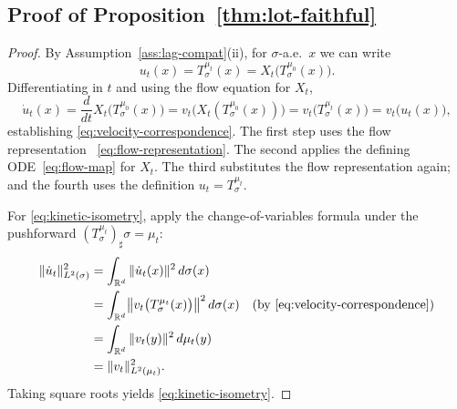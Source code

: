 \documentclass[11pt]{article}
\newcommand{\R}{\mathbb{R}}
\newcommand{\1}{\mathbf{1}}
\begin{document}
\subsection{Proof of Proposition~\ref{thm:lot-faithful}}
\label{app:proof-lot-faithful}
\begin{proof}
By Assumption~\ref{ass:lag-compat}(ii), for $\sigma$-a.e.\ $x$ we can write
\[
u_t(x) = T_\sigma^{\mu_t}(x) = X_t\bigl(T_\sigma^{\mu_0}(x)\bigr).
\]
Differentiating in $t$ and using the flow equation for $X_t$,
\[
\dot u_t(x)
= \frac{d}{dt} X_t\bigl(T_\sigma^{\mu_0}(x)\bigr)
= v_t\bigl(X_t(T_\sigma^{\mu_0}(x))\bigr)
= v_t\bigl(T_\sigma^{\mu_t}(x)\bigr)
= v_t\bigl(u_t(x)\bigr),
\]
establishing \eqref{eq:velocity-correspondence}. The first step uses the flow representation ~\eqref{eq:flow-representation}. The second applies the defining ODE~\eqref{eq:flow-map} for $X_t$. The third substitutes the flow representation again; and the fourth uses the definition $u_t = T_\sigma^{\mu_t}$.

For \eqref{eq:kinetic-isometry}, apply the change-of-variables formula under the pushforward $(T_\sigma^{\mu_t})_\sharp\sigma = \mu_t$:
\begin{align*}
\|\dot u_t\|_{L^2(\sigma)}^2
&= \int_{\R^d} \|\dot u_t(x)\|^2 \, d\sigma(x) \\
&= \int_{\R^d} \bigl\|v_t\bigl(T_\sigma^{\mu_t}(x)\bigr)\bigr\|^2 \, d\sigma(x)
\quad\text{(by \eqref{eq:velocity-correspondence})} \\
&= \int_{\R^d} \|v_t(y)\|^2 \, d\mu_t(y) \\
&= \|v_t\|_{L^2(\mu_t)}^2.
\end{align*}
Taking square roots yields \eqref{eq:kinetic-isometry}.
\end{proof}
\end{document}
